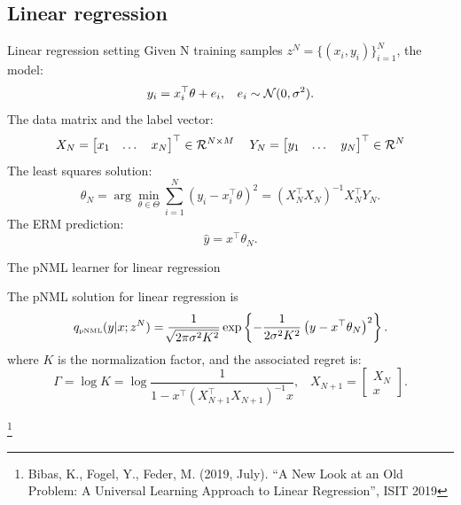 \documentclass[aspectratio=169]{beamer}
\newcommand\blfootnote[1]{%
  \begingroup
  \renewcommand\thefootnote{}\footnote{#1}%
  \addtocounter{footnote}{-1}%
  \endgroup
}
\begin{document}
\subsection{Linear regression}
\begin{frame}{Linear regression setting}
    Given N training samples $z^N=\{(x_i,y_i)\}_{i=1}^N$, the model:
    \begin{equation}
        y_i =x_i^\top \theta + e_i, \;\; \ e_i \sim \mathcal{N}(0,\sigma^2). 
    \vspace{5mm}
    \end{equation}
    The data matrix and the label vector:
    \begin{equation*}
        X_N = \begin{bmatrix} x_1 & \dots & x_N  \end{bmatrix}^\top \in \mathcal{R}^{N \times M} 
        \;\;\ \ 
        Y_N = \begin{bmatrix} y_1 & \dots & y_N \end{bmatrix}^\top \in \mathcal{R}^{N}
    \vspace{5mm}
    \end{equation*}
    The least squares solution:
    \begin{equation}
        \theta_N = \arg\min_{\theta\in\Theta} \sum_{i=1}^N \left(y_i - x_i^\top \theta \right)^2 = (X_N^\top X_N)^{-1}X_N^\top Y_N.
    \end{equation}
    The ERM prediction:
    \begin{equation*}
        \hat{y} = x^\top \theta_{N}.
    \end{equation*}{}
\end{frame}

\begin{frame}{The pNML learner for linear regression}
    \begin{theorem}
    The pNML solution for linear regression is
    \begin{equation}
    q_{\mbox{\tiny{pNML}}}(y | x; z^N) = \frac{1}{\sqrt[]{2\pi\sigma^2 K^2}}\exp\left\{-\frac{1}{2\sigma^2 K^2}\left(y - x^\top \theta_N \right)^2\right\}.
    \end{equation}
    where $K$ is the normalization factor, and 
    the associated regret is:
    \begin{equation}
    \Gamma = \log K = \log \frac{1}{1 - x^\top (X_{N+1}^\top X_{N+1} )^{-1} x }, \;\;\;X_{N+1} = \begin{bmatrix} X_N \\ x  \end{bmatrix}.  
    \end{equation}
    \end{theorem} 
    \blfootnote{Bibas, K., Fogel, Y., Feder, M. (2019, July). ``A New Look at an Old Problem: A Universal Learning Approach to Linear Regression'', ISIT 2019}
\end{frame}
\end{document}
